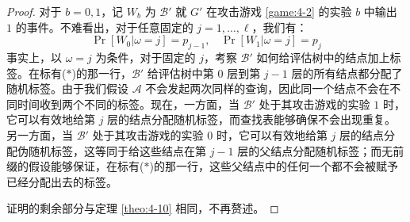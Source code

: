 \begin{proof}
对于 $b=0,1$，记 $W_b$ 为 $\mathcal{B}'$ 就 $G'$ 在攻击游戏 \ref{game:4-2} 的实验 $b$ 中输出 $1$ 的事件。不难看出，对于任意固定的 $j=1,\dots,\ell$，我们有：
\[
\Pr[W_0|\omega=j]=p_{j-1},~~~~
\Pr[W_1|\omega=j]=p_j
\]
事实上，以 $\omega=j$ 为条件，对于固定的 $j$，考察 $\mathcal{B}'$ 如何给评估树中的结点加上标签。在标有($*$)的那一行，$\mathcal{B}'$ 给评估树中第 $0$ 层到第 $j-1$ 层的所有结点都分配了随机标签。由于我们假设 $\mathcal{A}$ 不会发起两次同样的查询，因此同一个结点不会在不同时间收到两个不同的标签。现在，一方面，当 $\mathcal{B}'$ 处于其攻击游戏的实验 $1$ 时，它可以有效地给第 $j$ 层的结点分配随机标签，而查找表能够确保不会出现重复。另一方面，当 $\mathcal{B}'$ 处于其攻击游戏的实验 $0$ 时，它可以有效地给第 $j$ 层的结点分配伪随机标签，这等同于给这些结点在第 $j-1$ 层的父结点分配随机标签；而无前缀的假设能够保证，在标有($*$)的那一行，这些父结点中的任何一个都不会被赋予已经分配出去的标签。

证明的剩余部分与定理 \ref{theo:4-10} 相同，不再赘述。
\end{proof}